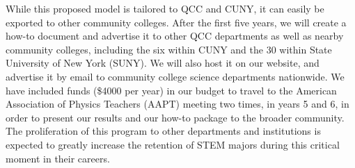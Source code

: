 \documentclass[12pt]{article}
\begin{document}
While this proposed model is tailored to QCC and CUNY, it can easily be exported to other community colleges.  After the first five years, we will create a how-to document and advertise it to other QCC departments as well as nearby community colleges, including the six within CUNY and the 30 within State University of New York (SUNY).  We will also host it on our website, and advertise it by email to community college science departments nationwide.  We have included funds (\$4000 per year) in our budget to travel to the American Association of Physics Teachers (AAPT) meeting two times, in years 5 and 6, in order to present our results and our how-to package to the broader community.  The proliferation of this program to other departments and institutions is expected to greatly increase the retention of STEM majors during this critical moment in their careers.   


%
%
%
%
%
%
\end{document}
